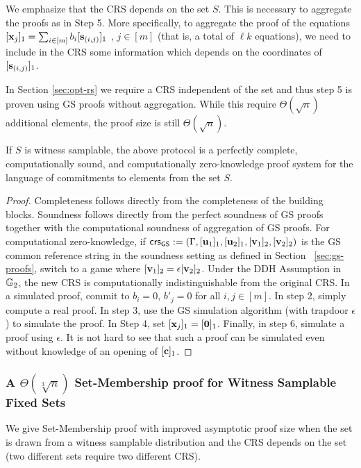 We emphasize that the CRS depends on the set $S$. This is necessary to aggregate the proofs as in Step 5. More  specifically, to aggregate the proof of the equations  $[\mathbf{x}_j]_1 = \sum_{i\in[m]}b_i [\mathbf{s}_{(i,j)}]_1$ , $j\in[m]$ (that is, a total of $\ell k$ equations), we need to include in the CRS some information which depends on the coordinates of $[\mathbf{s}_{(i,j)}]_1$.

In Section \ref{sec:opt-rs} we require a CRS independent of the set and thus step 5 is proven using GS proofs without aggregation. While this require $\Theta(\sqrt{n})$ additional elements, the proof size is still $\Theta(\sqrt{n})$.

\begin{theorem}\label{theo:listsquarevect}
If $S$ is witness samplable, the above protocol is a perfectly complete, computationally sound, and computationally zero-knowledge proof system for the language of commitments to elements from the set $S$.
\end{theorem}

\begin{proof} Completeness follows directly from the completeness of the 
building blocks. Soundness follows directly from the perfect soundness of GS proofs together with the computational soundness of aggregation of GS proofs. For computational zero-knowledge, if  
$\mathsf{crs}_{\mathsf{GS}}:=(\Gamma,[\mathbf{u}_1]_1,[\mathbf{u}_2]_1,[\mathbf{v}_1]_2,[\mathbf{v}_2]_2)$ is the GS common reference string in the soundness setting as defined in Section~ \ref{sec:gs-proofs}, switch to a game where $[\mathbf{v}_1]_2= \epsilon [\mathbf{v}_2]_2$. Under the DDH Assumption in $\mathbb{G}_2$, the new CRS is computationally indistinguishable from the original CRS. In a simulated proof, commit to $b_i=0$, $b'_j=0$ for all $i,j \in [m]$. In step 2, simply compute a real proof. In step 3, use the GS simulation algorithm  (with trapdoor $\epsilon$) to simulate the proof. In Step 4, set $[\mathbf{x}_j]_1=[\mathbf{0}]_1$. Finally, in step 6, simulate a proof using $\epsilon$. It is not hard to see that such a proof can be simulated even without knowledge of an opening of $[\mathbf{c}]_1$. 
\end{proof}

\subsubsection{A $\Theta(\sqrt[3]{n})$ Set-Membership proof for Witness Samplable Fixed Sets} We give Set-Membership proof with improved asymptotic proof size when the set is drawn from a witness samplable distribution and the CRS depends on the set (two different sets require two different CRS).

